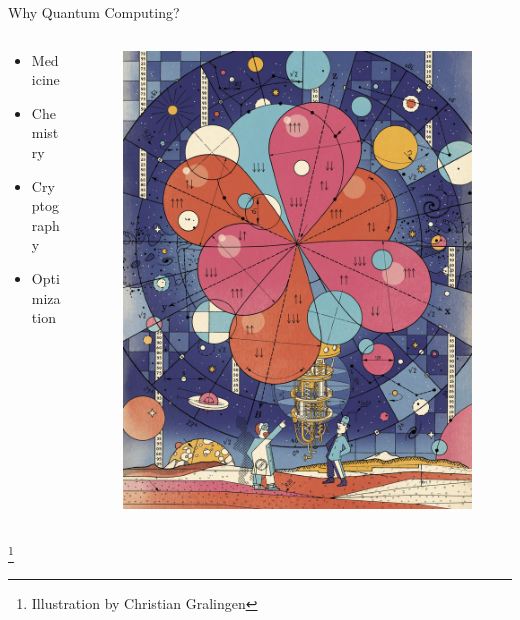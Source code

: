 \documentclass{beamer}
\newcommand\blfootnote[1]{%
	\begingroup
	\renewcommand\thefootnote{}\footnote{#1}%
	\addtocounter{footnote}{-1}%
	\endgroup
}
\begin{document}
{\begin{frame}{Why Quantum Computing?}
\begin{columns}
	\begin{column}{.49\textwidth}
		\begin{itemize}
			\item Medicine
			\item Chemistry
			\item Cryptography
			\item Optimization
		\end{itemize}
	\end{column}
	\begin{column}{.49\textwidth}
		\begin{figure}
			\includegraphics[width=\textwidth]{figures/cartoon}
		\end{figure}
		
	\end{column}
\end{columns}
\blfootnote{Illustration by Christian Gralingen}
\end{frame}

}
\end{document}
